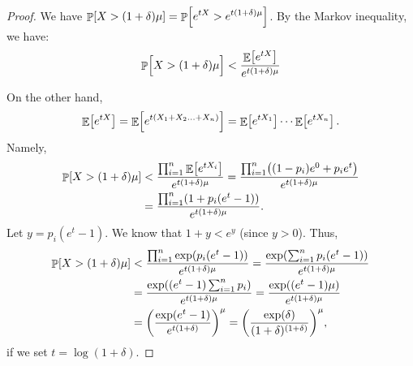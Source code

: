 \begin{proof}
    We have $\displaystyle \Prob{ X > (1+\delta)\mu } = \Prob{ e^{t X}
       > e^{t(1+\delta)\mu}}$.  By the Markov inequality, we have:
    \begin{align*}
        \Prob{\Big. X > (1+\delta)\mu } < \frac{ \Ex{e^{t
                 X}}}{e^{t(1+\delta)\mu}}
    \end{align*}

    On the other hand,
    \begin{align*}
        \mathop{\mathbb{E}}\!\left[ {e^{t X} } \right] = \mathop{\mathbb{E}}\!\left[ { e^{t(X_1 + X_2 \ldots + X_n)} } \right] =
        \mathop{\mathbb{E}}\!\left[ {e^{t X_1}} \right] \cdots \mathop{\mathbb{E}}\!\left[ {e^{t X_n}} \right].
    \end{align*}
    Namely,
    \begin{align*}
        \Prob{ X > (1+\delta)\mu }
        &< \frac{\prod_{i=1}^n \Ex{e^{t X_i}}}{e^{t(1+\delta)\mu}}
        = \frac{\prod_{i=1}^n \pth{ (1-p_i)e^0 + p_i e^{t }}} {e^{t(1+\delta)\mu}} \\
        &= \frac{\prod_{i=1}^n \pth{ 1+ p_i(e^{t} -1 ) }}
        {e^{t(1+\delta)\mu}}.
    \end{align*}
    Let $y = p_i (e^{t} - 1 )$. We know that $1+y < e^y$ (since $y >
    0$). Thus,
    \begin{align*}
        \Prob{ X > (1+\delta)\mu }%
        &<%
        \frac{\prod_{i=1}^n { \exp( p_i(e^{t} -1 )) }}
        {e^{t(1+\delta)\mu}}%
        =%
        \frac{\exp \pth{ \sum_{i=1}^n p_i(e^{t} -1 ) }}
        {e^{t(1+\delta)\mu}}%
        \\&%
        =%
        \frac{\exp \pth{ (e^{t} -1 )\sum_{i=1}^n p_i }}
        {e^{t(1+\delta)\mu}} = \frac{\exp \pth{ (e^{t} -1 )\mu }}
        {e^{t(1+\delta)\mu}}
        \\&%
        =%
        \pth{\frac{\exp \pth{ e^{t} -1 }}
           {e^{t(1+\delta)}}}^\mu%
        =%
        \pth{\frac{\exp \pth{ \delta }}
           {(1+\delta)^{(1+\delta)}}}^\mu,
    \end{align*}
    if we set $t = \log ( 1+\delta)$.
\end{proof}


